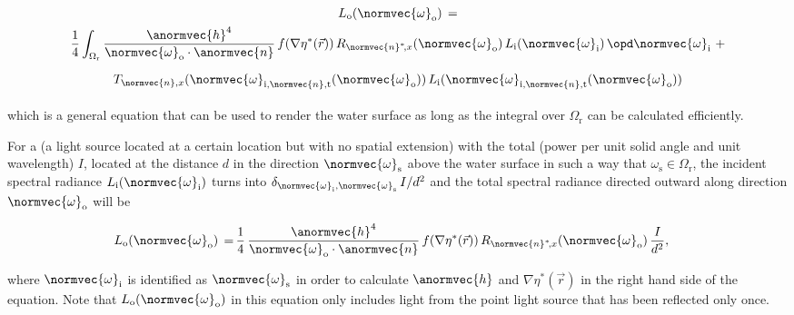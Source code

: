 \begin{equation} \label{eq:rendering_equation_simplified}
\renewcommand*{\arraystretch}{2}
\begin{array}{cl}
L_{\text{o}}(\normvec{\omega}_{\text{o}}) \,= \\
\displaystyle \frac{1}{4}\int_{\Omega_{\text{r}}} \frac{\anormvec{h}^4}{\normvec{\omega}_{\text{o}}\cdot\anormvec{n}}\,f(\nabla\eta^*(\vec{r}))\,R_{\normvec{n}^*\!,x}(\normvec{\omega}_{\text{o}})\, L_{\text{i}}(\normvec{\omega}_{\text{i}})\,\opd \normvec{\omega}_{\text{i}} \ + \\[1ex]
\displaystyle T_{\normvec{n},x}(\normvec{\omega}_{\text{i},\normvec{n},\text{t}}(\normvec{\omega}_{\text{o}}))\, L_{\text{i}}(\normvec{\omega}_{\text{i},\normvec{n},\text{t}}(\normvec{\omega}_{\text{o}}))
\end{array}
\end{equation}

which is a general equation that can be used to render the water surface as long as the integral over $\Omega_{\text{r}}$ can be calculated efficiently.

For a  (a light source located at a certain location but with no spatial extension) with the total  (power per unit solid angle and unit wavelength) $I$, located at the distance $d$ in the direction $\normvec{\omega}_{\text{s}}$ above the water surface in such a way that $\omega_{\text{s}} \in \Omega_{\text{r}}$, the incident spectral radiance $L_{\text{i}}(\normvec{\omega}_{\text{i}})$ turns into $\delta_{\normvec{\omega}_{\text{i}},\normvec{\omega}_{\text{s}}}\,I/d^2$ and the total spectral radiance directed outward along direction $\normvec{\omega}_{\text{o}}$ will be

\begin{equation} \label{eq:spectral_radience_reflected_point_light_source}
\renewcommand*{\arraystretch}{2}
\begin{aligned}
\displaystyle L_{\text{o}}(\normvec{\omega}_{\text{o}}) \,=\, & \frac{1}{4}\,\frac{\anormvec{h}^4}{\normvec{\omega}_{\text{o}}\cdot\anormvec{n}}\,f(\nabla\eta^*(\vec{r}))\,R_{\normvec{n}^*\!,x}(\normvec{\omega}_{\text{o}})\,\frac{I}{d^2},
\end{aligned}
\end{equation}

where $\normvec{\omega}_{\text{i}}$ is identified as $\normvec{\omega}_{\text{s}}$ in order to calculate $\anormvec{h}$ and $\nabla\eta^*(\vec{r})$ in the right hand side of the equation. Note that $L_{\text{o}}(\normvec{\omega}_{\text{o}})$ in this equation only includes light from the point light source that has been reflected only once.

